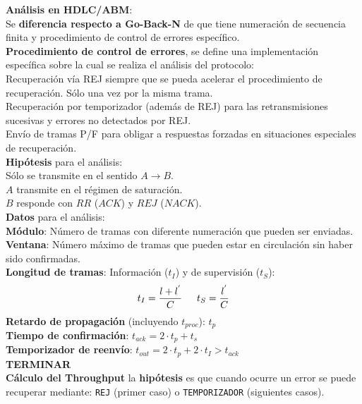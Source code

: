 \documentclass[9pt,landscape]{article}
\begin{document}
\begin{multicols}{3}
\textbf{Análisis en HDLC/ABM}:\\
	\quad Se \textbf{diferencia respecto a Go-Back-N} de que tiene numeración de secuencia finita y procedimiento de control de errores específico.\\
	\quad \textbf{Procedimiento de control de errores}, se define una implementación específica sobre la cual se realiza el análisis del protocolo:\\
		\qquad Recuperación vía REJ siempre que se pueda acelerar el procedimiento de recuperación. Sólo una vez por la misma trama.\\
		\qquad Recuperación por temporizador (además de REJ) para las retransmisiones sucesivas y errores no detectados por REJ.\\
		\qquad Envío de tramas P/F para obligar a respuestas forzadas en situaciones especiales de recuperación.\\
	
\textbf{Hipótesis} para el análisis:\\
		\quad Sólo se transmite en el sentido $A \rightarrow B$.\\
		\quad $A$ transmite en el régimen de saturación.\\
		\quad $B$ responde con $RR$ ($ACK$) y $REJ$ ($NACK$).\\
	
\textbf{Datos} para el análisis:\\
	\quad \textbf{Módulo}: Número de tramas con diferente numeración que pueden ser enviadas.\\
	\quad \textbf{Ventana}: Número máximo de tramas que pueden estar en circulación sin haber sido confirmadas.\\
	\quad \textbf{Longitud de tramas}: Información ($t_{I}$) y de supervisión ($t_{S}$):
		\begin{equation*}
			t_{I} = \frac{l + l^{'}}{C} \hspace{15 pt} t_{S} = \frac{l^{'}}{C}
		\end{equation*}
	\quad \textbf{Retardo de propagación} (incluyendo $t_{proc}$): $t_{p}$\\
	\quad \textbf{Tiempo de confirmación}: $t_{ack} = 2 \cdot t_{p} + t_{s}$\\
	\quad \textbf{Temporizador de reenvío}: $t_{out} = 2 \cdot t_{p} + 2 \cdot t_{I} > t_{ack}$\\	
	

\textbf{TERMINAR}\\

\textbf{Cálculo del Throughput} la \textbf{hipótesis} es que cuando ocurre un error se puede recuperar mediante: \texttt{REJ} (primer caso) o \texttt{TEMPORIZADOR} (siguientes casos).


\end{multicols}
\end{document}
